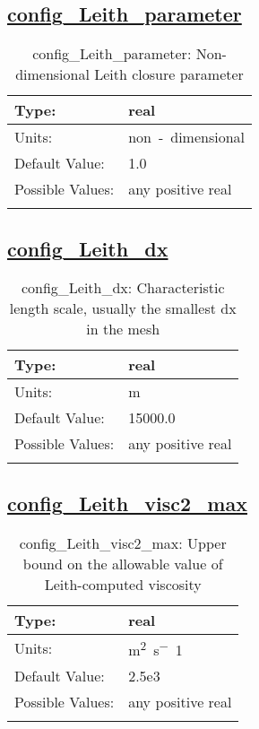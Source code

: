\subsection[config\_Leith\_parameter]{\hyperref[sec:nm_tab_hmix_Leith]{config\_Leith\_parameter}}
\label{subsec:nm_sec_config_Leith_parameter}
\begin{center}
\begin{longtable}{| p{2.0in} || p{4.0in} |}
    \hline
    Type: & real \\
    \hline
    Units: & \si{non-dimensional} \\
    \hline
    Default Value: & 1.0 \\
    \hline
    Possible Values: & any positive real \\
    \hline
    \caption{config\_Leith\_parameter: Non-dimensional Leith closure parameter}
\end{longtable}
\end{center}
\subsection[config\_Leith\_dx]{\hyperref[sec:nm_tab_hmix_Leith]{config\_Leith\_dx}}
\label{subsec:nm_sec_config_Leith_dx}
\begin{center}
\begin{longtable}{| p{2.0in} || p{4.0in} |}
    \hline
    Type: & real \\
    \hline
    Units: & \si{m} \\
    \hline
    Default Value: & 15000.0 \\
    \hline
    Possible Values: & any positive real \\
    \hline
    \caption{config\_Leith\_dx: Characteristic length scale, usually the smallest dx in the mesh}
\end{longtable}
\end{center}
\subsection[config\_Leith\_visc2\_max]{\hyperref[sec:nm_tab_hmix_Leith]{config\_Leith\_visc2\_max}}
\label{subsec:nm_sec_config_Leith_visc2_max}
\begin{center}
\begin{longtable}{| p{2.0in} || p{4.0in} |}
    \hline
    Type: & real \\
    \hline
    Units: & \si{m^2.s^-1} \\
    \hline
    Default Value: & 2.5e3 \\
    \hline
    Possible Values: & any positive real \\
    \hline
    \caption{config\_Leith\_visc2\_max: Upper bound on the allowable value of Leith-computed viscosity}
\end{longtable}
\end{center}
